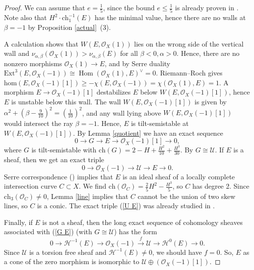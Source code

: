 \documentclass{amsart}
\DeclareMathOperator{\Hom}{Hom}
\begin{document}
	\begin{proof}We can assume that $e=\frac 15$, since the bound $e\le\frac 15$ is already proven in \cite[Lemma 4.2]{Vass}. Note also that $H^2\cdot\mathrm{ch}_1^{-1}(E)$ has the minimal value, hence there are no walls at $\beta=-1$ by Proposition \ref{actual}~(3).
		
		A calculation shows that $W(E,\mathcal O_X(1))$ lies on the wrong side of the vertical wall and $\nu_{\alpha,\beta}(\mathcal O_X(1))>\nu_{\alpha,\beta}(E)$ for all $\beta<0,\alpha>0$. Hence, there are no nonzero morphisms $\mathcal O_X(1)\to E$, and by Serre duality $\mathrm{Ext}^3(E,\mathcal O_X(-1))\cong\Hom(\mathcal O_X(1),E)^\vee=0$. Riemann--Roch gives $\mathrm{hom}(E,\mathcal O_X(-1)[1])\ge -\chi(E,\mathcal O_X(-1))=\chi(\mathcal O_X(1),E)=1$. A morphism $E\to\mathcal O_X(-1)[1]$ destabilizes $E$ below $W(E,\mathcal O_X(-1)[1])$, hence $E$ is unstable below this wall. The wall $W(E,\mathcal O_X(-1)[1])$ is given by $\alpha^2+(\beta-\frac{9}{10})^2=(\frac{1}{10})^2$, and any wall lying above $W(E,\mathcal O_X(-1)[1])$ would intersect the ray $\beta=-1$. Hence, $E$ is tilt-semistable at $W(E,\mathcal O_X(-1)[1])$. By Lemma \ref{quotient} we have an exact sequence
		\begin{equation}\label{G E}0\to G\to E\to\mathcal O_X(-1)[1]\to 0,\end{equation}
		where $G$ is tilt-semistable with $\mathrm{ch}(G)=2-H+\frac{H^2}{10}+\frac{H^3}{30}$. By \cite[Lemma 3.6]{Vass} $G\cong\mathcal U$. If $E$ is a sheaf, then we get an exact triple
		\begin{equation}\label{U E}0\to\mathcal O_X(-1)\to\mathcal U\to E\to 0.
		\end{equation}
		Serre correspondence (\cite[Theorem 1.1]{SVB}) implies that $E$ is an ideal sheaf of a locally complete intersection curve $C\subset X$. We find $\mathrm{ch}(\mathcal O_C)=\frac 25H^2-\frac{H^3}{5}$, so $C$ has degree 2. Since $\mathrm{ch}_3(\mathcal O_C)\neq 0$, Lemma \ref{line} implies that $C$ cannot be the union of two skew lines, so $C$ is a conic. The exact triple (\ref{U E}) was already studied in \cite[Example 3.2]{AC}.
		
		Finally, if $E$ is not a sheaf, then the long exact sequence of cohomology sheaves associated with (\ref{G E}) (with $G\cong\mathcal U$) has the form
		$$0\to\mathcal H^{-1}(E)\to\mathcal O_X(-1)\overset{f}{\to}\mathcal U\to\mathcal H^0(E)\to 0.$$
		Since $\mathcal U$ is a torsion free sheaf and $\mathcal H^{-1}(E)\neq 0$, we should have $f=0$. So, $E$ as a cone of the zero morphism is isomorphic to $\mathcal U\oplus(\mathcal O_X(-1)[1])$.
	\end{proof}
	
\end{document}
